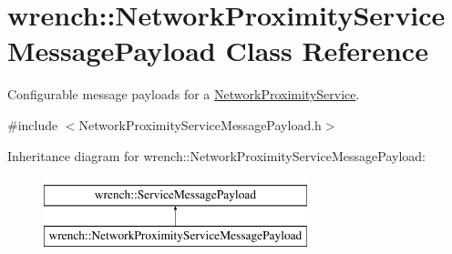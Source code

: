\hypertarget{classwrench_1_1_network_proximity_service_message_payload}{}\section{wrench\+:\+:Network\+Proximity\+Service\+Message\+Payload Class Reference}
\label{classwrench_1_1_network_proximity_service_message_payload}


Configurable message payloads for a \hyperlink{classwrench_1_1_network_proximity_service}{Network\+Proximity\+Service}.  




{\ttfamily \#include $<$Network\+Proximity\+Service\+Message\+Payload.\+h$>$}

Inheritance diagram for wrench\+:\+:Network\+Proximity\+Service\+Message\+Payload\+:\begin{figure}[H]
\begin{center}
\leavevmode
\includegraphics[height=2.000000cm]{classwrench_1_1_network_proximity_service_message_payload}
\end{center}
\end{figure}
